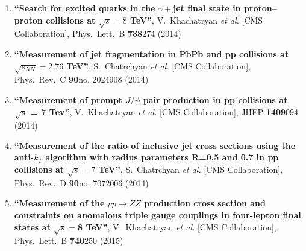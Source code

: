 \begin{enumerate}
\item%
{\bf ``Search for excited quarks in the $\gamma +$jet final state in proton–proton collisions at $\sqrt s=8$ TeV''}, 
  V.~Khachatryan {\it et al.}  [CMS Collaboration], 
Phys.\ Lett.\ B {\bf 738}274 (2014) %


\item%
{\bf ``Measurement of jet fragmentation in PbPb and pp collisions at $\sqrt{s_{NN}}=2.76$ TeV''}, 
  S.~Chatrchyan {\it et al.}  [CMS Collaboration], 
Phys.\ Rev.\ C {\bf 90}no. 2024908 (2014) %


\item%
{\bf ``Measurement of prompt $J/\psi$ pair production in pp collisions at $ \sqrt{s} $ = 7 Tev''}, 
  V.~Khachatryan {\it et al.}  [CMS Collaboration], 
JHEP {\bf 1409}094 (2014) %


\item%
{\bf ``Measurement of the ratio of inclusive jet cross sections using the anti-$k_T$ algorithm with radius parameters R=0.5 and 0.7 in pp collisions at $\sqrt{s}=7$ TeV''}, 
  S.~Chatrchyan {\it et al.}  [CMS Collaboration], 
Phys.\ Rev.\ D {\bf 90}no. 7072006 (2014) %


\item%
{\bf ``Measurement of the $pp \to ZZ$ production cross section and constraints on anomalous triple gauge couplings in four-lepton final states at $\sqrt s=$8 TeV''}, 
  V.~Khachatryan {\it et al.}  [CMS Collaboration], 
Phys.\ Lett.\ B {\bf 740}250 (2015) %



\end{enumerate}
